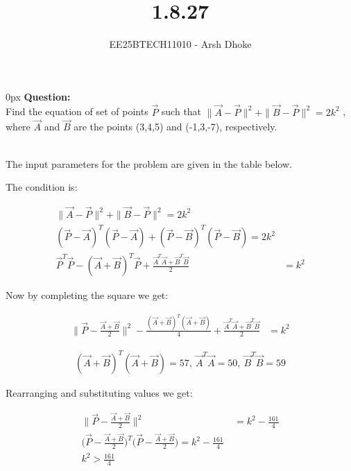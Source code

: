 \documentclass[journal]{IEEEtran}
\begin{document}

\vspace{3cm}

\title{1.8.27}
\author{EE25BTECH11010 - Arsh Dhoke}
{\let\newpage\relax\maketitle}

\renewcommand{\thefigure}{\theenumi}
\renewcommand{\thetable}{\theenumi}
\setlength{\intextsep}{10pt}
\renewcommand{\thetable}{\theenumi}

\parindent 0px
\textbf{Question:} \\
Find the equation of set of points $\vec{P}$ such that $\|\vec{A}-\vec{P}\|^2 + \|\vec{B}-\vec{P}\|^2 = 2k^2 $
, where $\vec{A}$ and $\vec{B}$ are the points (3,4,5) and (-1,3,-7), respectively.

\solution \\

The input parameters for the problem are given in the table below.



The condition is:

\begin{align}
\|\vec{A}-\vec{P}\|^2 + \|\vec{B}-\vec{P}\|^2 = 2k^2  \\
(\vec{P}-\vec{A})^T(\vec{P}-\vec{A}) + (\vec{P}-\vec{B})^T(\vec{P}-\vec{B}) = 2k^2   \\
\vec{P}^T\vec{P} - (\vec{A}+\vec{B})^T\vec{P} + \frac{\vec{A}^T\vec{A}+\vec{B}^T\vec{B}}{2}
&= k^2 
\end{align}

Now by completing the square we get:

\begin{align}
\Big\|\vec{P}-\frac{\vec{A}+\vec{B}}{2}\Big\|^2
- \frac{(\vec{A}+\vec{B})^T(\vec{A}+\vec{B})}{4}
+ \frac{\vec{A}^T\vec{A}+\vec{B}^T\vec{B}}{2}
&= k^2
\end{align}
 
\begin{align} 
(\vec{A}+\vec{B})^T(\vec{A}+\vec{B})=57,\ \vec{A}^T\vec{A}=50,\ \vec{B}^T\vec{B}=59
\end{align}

Rearranging and substituting values we get:

\begin{align} 
\Big\|\vec{P}-\frac{\vec{A}+\vec{B}}{2}\Big\|^2
&= k^2 - \frac{161}{4} \\
\Big(\vec{P}-\frac{\vec{A}+\vec{B}}{2}\Big)^T
\Big(\vec{P}-\frac{\vec{A}+\vec{B}}{2}\Big)
= k^2 - \frac{161}{4}\ \\
k^2>\frac{161}{4}
\end{align}
\end{document}
